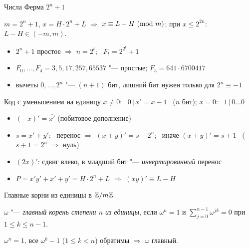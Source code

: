 \documentclass{ca-slides}
\begin{document}
\begin{canvasframe}{Числа Ферма $2^n + 1$}
  \small
  \begin{proposition}
    $m = 2^n + 1$, $x = H \cdot 2^n + L$ $\Rightarrow$ $x \equiv L - H\ (\mathrm{mod}\ m)$;
    при $x \le 2^{2n}$: $L - H \in (-m, m)$.
  \end{proposition}
  \begin{itemize}
    \item $2^n + 1$ простое $\Rightarrow$ $n = 2^t$; \ $F_t = 2^{2^t} + 1$
    \item $F_0, \dots, F_4 = 3, 5, 17, 257, 65537$ "--- простые;
      $F_5 = 641 \cdot 6700417$
    \item вычеты $0, \dots, 2^n$ "--- $(n{+}1)$ бит, лишний бит нужен только для $2^n \equiv -1$
  \end{itemize}
\end{canvasframe}

\begin{canvasframe}{Код с уменьшением на единицу}
  \small
  $x \ne 0$: \ $0 \,|\, x' = x - 1$ \ ($n$ бит); \qquad $x = 0$: \ $1 \,|\, 0\dots0$
  \medskip
  \begin{itemize}
    \item $(-x)' = \overline{x'}$ (побитовое дополнение)
    \item $s = x' + y'$: \ перенос $\Rightarrow$ $(x + y)' = s - 2^n$; \
      иначе $(x+y)' = s + 1$ \ ($s + 1 = 2^n$ $\Rightarrow$ нуль)
    \item $(2x)'$: сдвиг влево, в младший бит "--- \emph{инвертированный} перенос
    \item $P = x'y' + x' + y' = H \cdot 2^n + L$ $\Rightarrow$ $(xy)' \equiv L - H$
  \end{itemize}
\end{canvasframe}

\begin{canvasframe}{Главные корни из единицы в $\mathbb{Z}/m\mathbb{Z}$}
  \small
  \begin{definition}
    $\omega$ "--- \emph{главный корень степени $n$ из единицы}, если $\omega^n = 1$ и
    $\sum_{j=0}^{n-1} \omega^{jk} = 0$ при $1 \le k \le n - 1$.
  \end{definition}
  \begin{lemma}
    $\omega^n = 1$, все $\omega^k - 1$ ($1 \le k < n$) обратимы $\Rightarrow$ $\omega$ главный.
  \end{lemma}
  \par\smallskip{\small\textcolor{caGray}{Доказательство:}}
\end{canvasframe}
\end{document}
